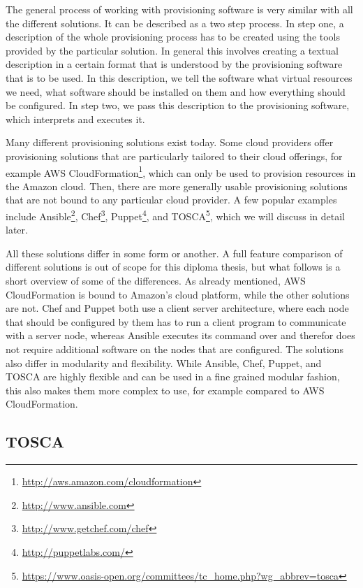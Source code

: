The general process of working with provisioning software is very similar with all the different solutions.
It can be described as a two step process.
In step one, a description of the whole provisioning process has to be created using the tools provided by the particular solution.
In general this involves creating a textual description in a certain format that is understood by the provisioning software that is to be used.
In this description, we tell the software what virtual resources we need, what software should be installed on them and how everything should be configured.
In step two, we pass this description to the provisioning software, which interprets and executes it.

Many different provisioning solutions exist today.
Some cloud providers offer provisioning solutions that are particularly tailored to their cloud offerings, for example AWS CloudFormation\footnote{\url{http://aws.amazon.com/cloudformation}}, which can only be used to provision resources in the Amazon cloud.
Then, there are more generally usable provisioning solutions that are not bound to any particular cloud provider.
A few popular examples include Ansible\footnote{\url{http://www.ansible.com}}, Chef\footnote{\url{http://www.getchef.com/chef}}, Puppet\footnote{\url{http://puppetlabs.com/}}, and TOSCA\footnote{\url{https://www.oasis-open.org/committees/tc_home.php?wg_abbrev=tosca}}, which we will discuss in detail later.

All these solutions differ in some form or another.
A full feature comparison of different solutions is out of scope for this diploma thesis, but what follows is a short overview of some of the differences.
As already mentioned, AWS CloudFormation is bound to Amazon's cloud platform, while the other solutions are not.
Chef and Puppet both use a client server architecture, where each node that should be configured by them has to run a client program to communicate with a server node, whereas Ansible executes its command over  and therefor does not require additional software on the nodes that are configured.
The solutions also differ in modularity and flexibility. While Ansible, Chef, Puppet, and TOSCA are highly flexible and can be used in a fine grained modular fashion, this also makes them more complex to use, for example compared to AWS CloudFormation.

\subsection{TOSCA}


